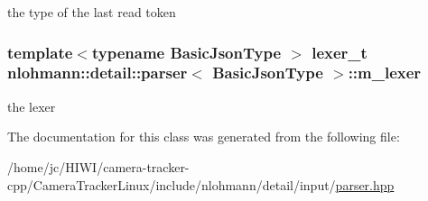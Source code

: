 the type of the last read token 

\subsubsection[{\texorpdfstring{m\+\_\+lexer}{m_lexer}}]{\setlength{\rightskip}{0pt plus 5cm}template$<$typename Basic\+Json\+Type $>$ {\bf lexer\+\_\+t} {\bf nlohmann\+::detail\+::parser}$<$ Basic\+Json\+Type $>$\+::m\+\_\+lexer\hspace{0.3cm}{\ttfamily [private]}}\hypertarget{classnlohmann_1_1detail_1_1parser_a22dcc815551a4052b87797b34171b352}{}\label{classnlohmann_1_1detail_1_1parser_a22dcc815551a4052b87797b34171b352}


the lexer 



The documentation for this class was generated from the following file\+:\begin{DoxyCompactItemize}
\item 
/home/jc/\+H\+I\+W\+I/camera-\/tracker-\/cpp/\+Camera\+Tracker\+Linux/include/nlohmann/detail/input/\hyperlink{parser_8hpp}{parser.\+hpp}\end{DoxyCompactItemize}
